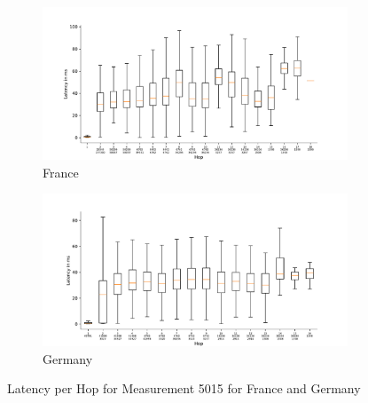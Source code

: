 \begin{figure}
	\centering
	\begin{subfigure}[b]{\linewidth}
		\includegraphics[width=\linewidth]{chapters/4-results/traceroute/img/latency-per-hop-FR-5015.pdf}
		\caption{France}
	\end{subfigure}
	\begin{subfigure}[b]{\linewidth}
		\includegraphics[width=\linewidth]{chapters/4-results/traceroute/img/latency-per-hop-DE-5015.pdf}
		\caption{Germany}
	\end{subfigure}
	\caption{Latency per Hop for Measurement 5015 for France and Germany}
	\label{fig:latency-change-per-hop-appendix-16}
\end{figure}

